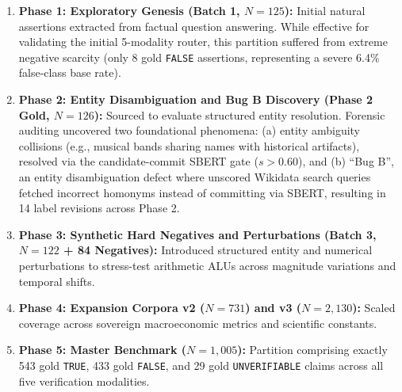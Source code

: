 \begin{enumerate}
    \item \textbf{Phase 1: Exploratory Genesis (Batch 1, $N=125$):} Initial natural assertions extracted from factual question answering. While effective for validating the initial 5-modality router, this partition suffered from extreme negative scarcity (only 8 gold \texttt{FALSE} assertions, representing a severe 6.4\% false-class base rate).
    \item \textbf{Phase 2: Entity Disambiguation and Bug B Discovery (Phase 2 Gold, $N=126$):} Sourced to evaluate structured entity resolution. Forensic auditing uncovered two foundational phenomena: (a) entity ambiguity collisions (e.g., musical bands sharing names with historical artifacts), resolved via the candidate-commit SBERT gate ($s > 0.60$), and (b) ``Bug B'', an entity disambiguation defect where unscored Wikidata search queries fetched incorrect homonyms instead of committing via SBERT, resulting in 14 label revisions across Phase 2.
    \item \textbf{Phase 3: Synthetic Hard Negatives and Perturbations (Batch 3, $N=122$ + 84 Negatives):} Introduced structured entity and numerical perturbations to stress-test arithmetic ALUs across magnitude variations and temporal shifts.
    \item \textbf{Phase 4: Expansion Corpora v2 ($N=731$) and v3 ($N=2,130$):} Scaled coverage across sovereign macroeconomic metrics and scientific constants.
    \item \textbf{Phase 5: Master Benchmark ($N = 1{,}005$):} Partition comprising exactly 543 gold \texttt{TRUE}, 433 gold \texttt{FALSE}, and 29 gold \texttt{UNVERIFIABLE} claims across all five verification modalities.
\end{enumerate}

